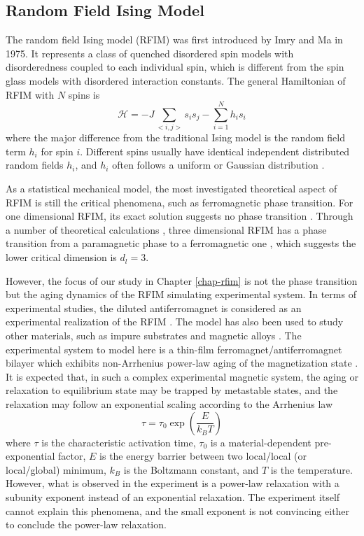 \subsection{Random Field Ising Model}
\label{sec:intro-rfim}
The random field Ising model (RFIM) was first introduced by Imry and Ma \cite{imry1975random} in 1975. It represents a class of quenched disordered spin models \cite{young1997spin} with  disorderedness coupled to each individual spin, which is different from the spin glass models with disordered interaction constants. The general Hamiltonian of RFIM with $N$ spins is
\begin{equation}
\mathcal{H}=-J\sum_{<i,j>}s_{i}s_{j}-\sum_{i=1}^{N}h_{i}s_{i}
\end{equation}
where the major difference from the traditional Ising model is the random field term $h_i$ for spin $i$. Different spins usually have  identical independent distributed random fields $h_i$, and $h_i$ often follows a uniform \cite{nattermann1997theory} or Gaussian distribution \cite{newman1999}.

As a statistical mechanical model, the most investigated theoretical aspect of RFIM is still the critical phenomena, such as ferromagnetic phase transition. For one dimensional RFIM, its exact solution suggests no phase transition \cite{grinstein1983exact}. Through a number of theoretical calculations \cite{parisi1979random, bricmont1987lower}, three dimensional RFIM has a phase transition from a paramagnetic phase to a ferromagnetic one  \cite{bricmont1987lower}, which suggests the lower critical dimension is $d_l = 3$. 

However, the focus of our study in Chapter \ref{chap-rfim} is not the phase transition but the aging dynamics of the RFIM simulating experimental system. In terms of experimental studies, the diluted antiferromagnet is considered as an experimental realization of the RFIM \cite{belanger1985, fernandez1988random}. The model has also been used to study other materials, such as  impure substrates \cite{villain1982commensurate} and magnetic alloys \cite{fisher1988theory}. 
The experimental system to model here is a thin-film ferromagnet/antiferromagnet bilayer which exhibits non-Arrhenius power-law aging of the magnetization state \cite{ma2016prb}. 
It is expected that, in such a complex experimental magnetic system, the aging or relaxation to equilibrium state may be trapped by metastable states, and the relaxation may follow an exponential scaling according to the Arrhenius law \cite{Arrhenius1989}
\begin{equation}
\tau = \tau_0 \exp \left( \frac{E}{k_B T}\right)
\end{equation}
where $\tau$ is the characteristic activation time, $\tau_0$ is a material-dependent pre-exponential factor, $E$ is the energy barrier between two local/local (or local/global) minimum, $k_B$ is the Boltzmann constant, and $T$ is the temperature. However, what is observed in the experiment is a power-law relaxation with a subunity exponent instead of an exponential relaxation. The experiment itself cannot explain this phenomena, and the small exponent is not convincing either to conclude the power-law relaxation. 

